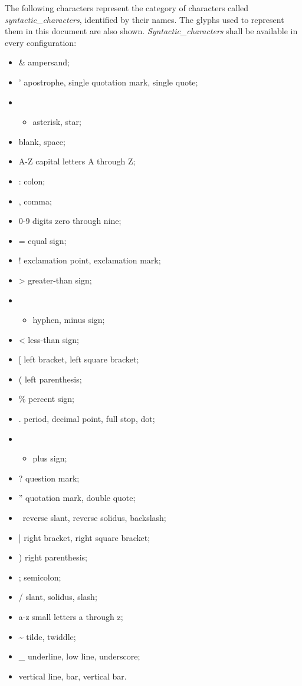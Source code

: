 The following characters represent the category of characters called
\emph{syntactic\_characters}, identified by their names. The glyphs used
to represent them in this document are also shown.
\emph{Syntactic\_characters} shall be available in every configuration:

\begin{itemize}
\item
  \& ampersand;
\item
  ' apostrophe, single quotation mark, single quote;
\item
  \begin{itemize}
  \tightlist
  \item
    asterisk, star;
  \end{itemize}
\item
  blank, space;
\item
  A-Z capital letters A through Z;
\item
  : colon;
\item
  , comma;
\item
  0-9 digits zero through nine;
\item
  = equal sign;
\item
  ! exclamation point, exclamation mark;
\item
  \textgreater{} greater-than sign;
\item
  \begin{itemize}
  \tightlist
  \item
    hyphen, minus sign;
  \end{itemize}
\item
  \textless{} less-than sign;
\item
  {[} left bracket, left square bracket;
\item
  ( left parenthesis;
\item
  \% percent sign;
\item
  . period, decimal point, full stop, dot;
\item
  \begin{itemize}
  \tightlist
  \item
    plus sign;
  \end{itemize}
\item
  ? question mark;
\item
  '' quotation mark, double quote;
\item
  ~reverse slant, reverse solidus, backslash;
\item
  {]} right bracket, right square bracket;
\item
  ) right parenthesis;
\item
  ; semicolon;
\item
  / slant, solidus, slash;
\item
  a-z small letters a through z;
\item
  \textasciitilde{} tilde, twiddle;
\item
  \_ underline, low line, underscore;
\item
  vertical line, bar, vertical bar.
\end{itemize}

